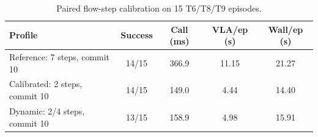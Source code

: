 \begin{table}
\caption{Paired flow-step calibration on 15 T6/T8/T9 episodes.}
\label{tab:calibration}
\centering\small
\begin{tabular}{lcccc}
\toprule
Profile & Success & Call (ms) & VLA/ep (s) & Wall/ep (s) \\
\midrule
Reference: 7 steps, commit 10 & 14/15 & 366.9 & 11.15 & 21.27 \\
Calibrated: 2 steps, commit 10 & 14/15 & 149.0 & 4.44 & 14.40 \\
Dynamic: 2/4 steps, commit 10 & 13/15 & 158.9 & 4.98 & 15.91 \\
\bottomrule
\end{tabular}
\end{table}

